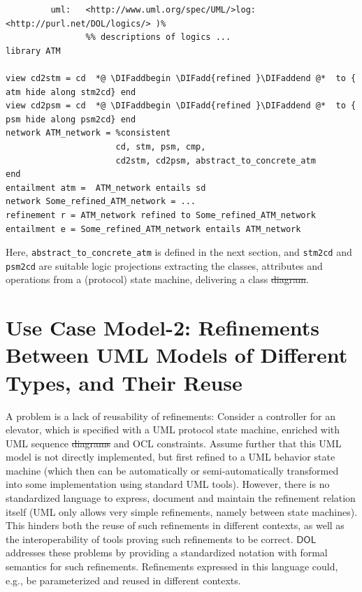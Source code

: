 \documentclass[10pt,fleqn,final]{scrreprt}
\newcommand*{\DOL}{\ensuremath{\mathsf{DOL}}\xspace}
\newenvironment{definitions}[0]{\medskip }{}
\providecommand{\DIFadd}[1]{{\protect\color{blue}\uwave{#1}}} %
\providecommand{\DIFdel}[1]{{\protect\color{red}\sout{#1}}}                      %
\providecommand{\DIFaddbegin}{} %
\providecommand{\DIFaddend}{} %
\providecommand{\DIFdelbegin}{} %
\providecommand{\DIFdelend}{} %
\begin{document}
\begin{definitions}
\begin{lstlisting}[basicstyle=\ttfamily,language=dolText,escapechar=@,mathescape]
%prefix( :      <http://www.example.org/uml/>
         uml:   <http://www.uml.org/spec/UML/>log:   <http://purl.net/DOL/logics/> )%
                %% descriptions of logics ...
library ATM

view cd2stm = cd  *@ \DIFaddbegin \DIFadd{refined }\DIFaddend @*  to { atm hide along stm2cd} end
view cd2psm = cd  *@ \DIFaddbegin \DIFadd{refined }\DIFaddend @*  to { psm hide along psm2cd} end
network ATM_network = %consistent
                      cd, stm, psm, cmp,
                      cd2stm, cd2psm, abstract_to_concrete_atm
end
entailment atm =  ATM_network entails sd
network Some_refined_ATM_network = ...  
refinement r = ATM_network refined to Some_refined_ATM_network
entailment e = Some_refined_ATM_network entails ATM_network
\end{lstlisting}
Here, \texttt{abstract\_to\_concrete\_atm} is defined in the next
section, and \texttt{stm2cd} and \texttt{psm2cd} are suitable logic
projections extracting the classes, attributes and operations from a
(protocol) state machine, delivering a class \DIFdelbegin \DIFdel{diagram}\DIFdelend \DIFaddbegin \DIFadd{model}\DIFaddend .

\DIFdelbegin %
\DIFdelend \DIFaddbegin \section{Use Case Model-2: Refinements Between UML Models of Different Types, and Their Reuse}
\DIFaddend \label{model-2}

A problem is a lack of reusability of refinements: Consider a controller for an elevator, which is specified with a UML protocol state machine, enriched with UML 
sequence \DIFdelbegin \DIFdel{diagrams }\DIFdelend \DIFaddbegin \DIFadd{models }\DIFaddend and OCL constraints. Assume further that this UML model is not directly implemented, but first refined to a UML behavior state machine (which then 
can be automatically or semi-automatically transformed into some implementation using standard UML tools). However, there is no standardized language to 
express, document and maintain the refinement relation itself (UML only allows very simple refinements, namely between state machines). This hinders both the 
reuse of such refinements in different contexts, as well as the interoperability of tools proving such refinements to be correct. \DOL  
addresses these problems by providing a standardized notation with formal semantics for such refinements. Refinements expressed in this language could, e.g., be 
parameterized and reused in different contexts.


\end{definitions}
\end{document}
